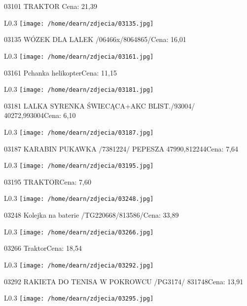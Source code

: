03101 TRAKTOR Cena: 21,39\newline
\begin{wrapfigure}{L}{0.3\textwidth}
\texttt{[image: /home/dearn/zdjecia/03135.jpg]}
\end{wrapfigure}
03135 WÓZEK DLA LALEK /06466x/8064865/Cena: 16,01\newline
\begin{wrapfigure}{L}{0.3\textwidth}
\texttt{[image: /home/dearn/zdjecia/03161.jpg]}
\end{wrapfigure}
03161 Pchanka helikopterCena: 11,15\newline
\begin{wrapfigure}{L}{0.3\textwidth}
\texttt{[image: /home/dearn/zdjecia/03181.jpg]}
\end{wrapfigure}
03181 LALKA SYRENKA ŚWIECĄCA+AKC BLIST./93004/  40272,993004Cena: 6,10\newline
\begin{wrapfigure}{L}{0.3\textwidth}
\texttt{[image: /home/dearn/zdjecia/03187.jpg]}
\end{wrapfigure}
03187 KARABIN PUKAWKA /7381224/  PEPESZA        47990,812244Cena: 7,64\newline
\begin{wrapfigure}{L}{0.3\textwidth}
\texttt{[image: /home/dearn/zdjecia/03195.jpg]}
\end{wrapfigure}
03195 TRAKTORCena: 7,60\newline
\begin{wrapfigure}{L}{0.3\textwidth}
\texttt{[image: /home/dearn/zdjecia/03248.jpg]}
\end{wrapfigure}
03248 Kolejka na baterie /TG220668/813586/Cena: 33,89\newline
\begin{wrapfigure}{L}{0.3\textwidth}
\texttt{[image: /home/dearn/zdjecia/03266.jpg]}
\end{wrapfigure}
03266 TraktorCena: 18,54\newline
\begin{wrapfigure}{L}{0.3\textwidth}
\texttt{[image: /home/dearn/zdjecia/03292.jpg]}
\end{wrapfigure}
03292 RAKIETA DO TENISA W POKROWCU /PG3174/           831748Cena: 13,91\newline
\begin{wrapfigure}{L}{0.3\textwidth}
\texttt{[image: /home/dearn/zdjecia/03295.jpg]}
\end{wrapfigure}
